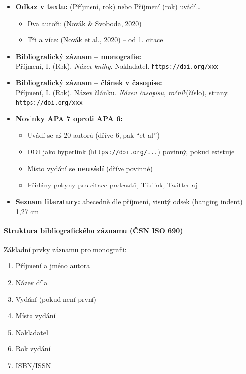 \begin{itemize}
  \item \textbf{Odkaz v textu:} (Příjmení, rok) nebo Příjmení (rok) uvádí\ldots
    \begin{itemize}
      \item Dva autoři: (Novák \& Svoboda, 2020)
      \item Tři a více: (Novák et al., 2020) -- od 1. citace
    \end{itemize}
  \item \textbf{Bibliografický záznam -- monografie:}\\
    Příjmení, I. (Rok). \textit{Název knihy}. Nakladatel. \texttt{https://doi.org/xxx}
  \item \textbf{Bibliografický záznam -- článek v časopise:}\\
    Příjmení, I. (Rok). Název článku. \textit{Název časopisu}, \textit{ročník}(číslo), strany. \texttt{https://doi.org/xxx}
  \item \textbf{Novinky APA 7 oproti APA 6:}
    \begin{itemize}
      \item Uvádí se až 20 autorů (dříve 6, pak ``et al.'')
      \item DOI jako hyperlink (\texttt{https://doi.org/...}) povinný, pokud existuje
      \item Místo vydání se \textbf{neuvádí} (dříve povinné)
      \item Přidány pokyny pro citace podcastů, TikTok, Twitter aj.
    \end{itemize}
  \item \textbf{Seznam literatury:} abecedně dle příjmení, visutý odsek (hanging indent) 1,27 cm
\end{itemize}

\paragraph{Struktura bibliografického záznamu (ČSN ISO 690)}

Základní prvky záznamu pro monografii:
\begin{enumerate}
  \item Příjmení a jméno autora
  \item Název díla
  \item Vydání (pokud není první)
  \item Místo vydání
  \item Nakladatel
  \item Rok vydání
  \item ISBN/ISSN
\end{enumerate}

